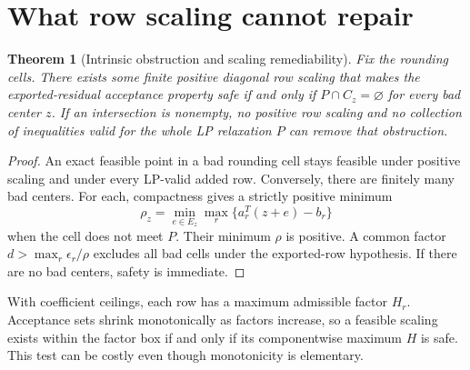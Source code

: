 \documentclass[11pt]{article}
\newtheorem{theorem}{Theorem}
\begin{document}
\section{What row scaling cannot repair}
\begin{theorem}[Intrinsic obstruction and scaling remediability]
Fix the rounding cells. There exists some finite positive diagonal row scaling
that makes the exported-residual acceptance property safe if and only if
$P\cap C_z=\varnothing$ for every bad center $z$. If an intersection is nonempty,
no positive row scaling and no collection of inequalities valid for the whole LP
relaxation $P$ can remove that obstruction.
\end{theorem}
\begin{proof}
An exact feasible point in a bad rounding cell stays feasible under positive scaling
and under every LP-valid added row. Conversely, there are finitely many bad centers.
For each, compactness gives a strictly positive minimum
\[
 \rho_z=\min_{e\in E_z}\max_r\{a_r^T(z+e)-b_r\}
\]
when the cell does not meet $P$. Their minimum $\rho$ is positive. A common factor
$d>\max_r\epsilon_r/\rho$ excludes all bad cells under the exported-row hypothesis.
If there are no bad centers, safety is immediate.
\end{proof}
With coefficient ceilings, each row has a maximum admissible factor $H_r$.
Acceptance sets shrink monotonically as factors increase, so a feasible scaling
exists within the factor box if and only if its componentwise maximum $H$ is safe.
This test can be costly even though monotonicity is elementary.
\end{document}
